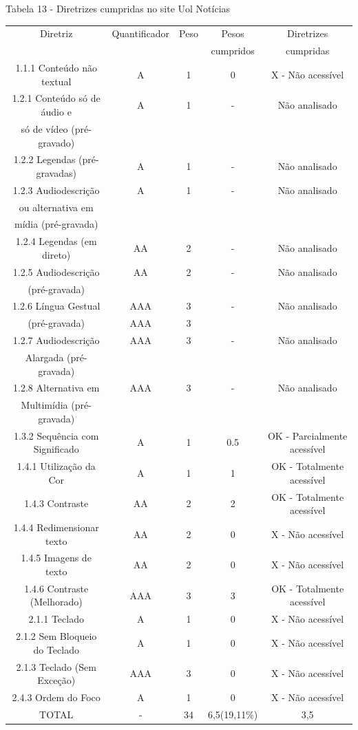 \documentclass[a4paper]{article}
\begin{document}
\begin{titlepage}
Tabela 13 - Diretrizes cumpridas no site Uol Notícias\\[-1cm]
\begin{center}
	\fontsize{8pt}{8pt}\selectfont	
	\begin{longtable}{|c|c|c|c|c|}
		\hline
		Diretriz & Quantificador & Peso & Pesos & Diretrizes\\
		& & & cumpridos & cumpridas\\
		\hline
		1.1.1 Conteúdo não textual & A & 1 & 0 & X - Não acessível \\
		\hline
		1.2.1 Conteúdo só de áudio e & A & 1 & - & Não analisado \\
		só de vídeo (pré-gravado) & & & & \\
		\hline
		1.2.2 Legendas (pré-gravadas) & A & 1 & - & Não analisado \\
		\hline
		1.2.3 Audiodescrição & A & 1 & - & Não analisado \\
		ou alternativa em & & & & \\
		mídia (pré-gravada) & & & & \\
		\hline
		1.2.4 Legendas (em direto) & AA & 2 & - & Não analisado \\
		\hline
		1.2.5 Audiodescrição & AA & 2 & - & Não analisado \\
		(pré-gravada) & & & & \\
		\hline
		1.2.6 Língua Gestual & AAA & 3 & - & Não analisado \\
		(pré-gravada) & AAA & 3 & & \\
		\hline
		1.2.7 Audiodescrição & AAA & 3 & - & Não analisado \\
		Alargada (pré-gravada) & & & & \\
		\hline
		1.2.8 Alternativa em & AAA & 3 & - & Não analisado \\
		Multimídia (pré-gravada) & & & & \\
		\hline
		1.3.2 Sequência com Significado & A & 1 & 0.5 & OK - Parcialmente acessível \\
		\hline
		1.4.1 Utilização da Cor & A & 1 & 1 & OK - Totalmente acessível \\
		\hline
		1.4.3 Contraste & AA & 2 & 2 & OK - Totalmente acessível \\
		\hline
		1.4.4 Redimensionar texto & AA & 2 & 0 & X - Não acessível \\
		\hline
		1.4.5 Imagens de texto & AA & 2 & 0 & X - Não acessível \\
		\hline
		1.4.6 Contraste (Melhorado) & AAA & 3 & 3 & OK - Totalmente acessível \\
		\hline
		2.1.1 Teclado & A & 1 & 0 & X - Não acessível \\
		\hline
		2.1.2 Sem Bloqueio do Teclado & A & 1 & 0 & X - Não acessível \\
		\hline
		2.1.3 Teclado (Sem Exceção) & AAA & 3 & 0 & X - Não acessível \\
		\hline
		2.4.3 Ordem do Foco & A & 1 & 0 & X - Não acessível \\
		\hline
		TOTAL & - & 34 & 6,5(19,11\%) & 3,5 \\
		\hline
	\end{longtable}
\end{center}


\end{titlepage}
\end{document}
